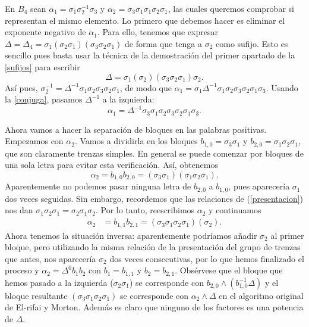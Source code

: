 \documentclass[bibtex, anon]{TEMat-article}
\begin{document}
\begin{ejemplo}\label{ejnormal}
	En $B_4$ sean $\alpha_1=\sigma_1\sigma_2^{-1}\sigma_3$ y $\alpha_2=\sigma_3\sigma_1\sigma_1\sigma_2\sigma_1$, las cuales queremos comprobar si representan el mismo elemento. Lo primero que debemos hacer es eliminar el exponente negativo de $\alpha_1$. Para ello, tenemos que expresar $\Delta=\Delta_4=\sigma_1(\sigma_2\sigma_1)(\sigma_3\sigma_2\sigma_1)$ de forma que tenga a $\sigma_2$ como sufijo. Esto es sencillo pues basta usar la técnica de la demostración del primer apartado de la \cref{sufijos} para escribir
	\[
	\Delta=\sigma_1(\sigma_2)(\sigma_3\sigma_2\sigma_1)\sigma_2.
	\]
	Así pues, $\sigma_2^{-1}=\Delta^{-1}\sigma_1\sigma_2\sigma_3\sigma_2\sigma_1$, de modo que $\alpha_1=\sigma_1\Delta^{-1}\sigma_1\sigma_2\sigma_3\sigma_2\sigma_1\sigma_3$. Usando la \cref{conjuga}, pasamos $\Delta^{-1}$ a la izquierda:
	\[
	\alpha_1=\Delta^{-1}\sigma_3\sigma_1\sigma_2\sigma_3\sigma_2\sigma_1\sigma_3.
	\]
	
	Ahora vamos a hacer la separación de bloques en las palabras positivas. Empezamos con $\alpha_2$. Vamos a dividirla en los bloques $b_{1,0}=\sigma_3\sigma_1$ y $b_{2,0}=\sigma_1\sigma_2\sigma_1$, que son claramente trenzas simples. En general se puede comenzar por bloques de una sola letra para evitar esta verificación. Así, obtenemos
	\[
	\alpha_2=b_{1,0}b_{2,0}=(\sigma_3\sigma_1)(\sigma_1\sigma_2\sigma_1).
	\]
	Aparentemente no podemos pasar ninguna letra de $b_{2,0}$ a $b_{1,0}$, pues aparecería $\sigma_1$ dos veces seguidas. Sin embargo, recordemos que las relaciones de (\ref{presentacion}) nos dan $\sigma_1\sigma_2\sigma_1=\sigma_2\sigma_1\sigma_2$. Por lo tanto, reescribimos $\alpha_2$ y continuamos
	\begin{align*}
	\alpha_2&=b_{1,1}b_{2,1}=(\sigma_3\sigma_1\sigma_2\sigma_1)(\sigma_2).
	\end{align*}
	Ahora tenemos la situación inversa: aparentemente podríamos añadir $\sigma_2$ al primer bloque, pero utilizando la misma relación de la presentación del grupo de trenzas que antes, nos aparecería $\sigma_2$ dos veces consecutivas, por lo que hemos finalizado el proceso y $\alpha_2=\Delta^0b_1b_2$ con $b_1=b_{1,1}$ y $b_2=b_{2,1}$. Obsérvese que el bloque que hemos pasado a la izquierda ($\sigma_2\sigma_1$) se corresponde con $b_{2,0}\land (b_{1,0}^{-1}\Delta)$ y el bloque resultante $(\sigma_3\sigma_1\sigma_2\sigma_1)$ se corresponde con $\alpha_2\land\Delta$ en el algoritmo original de El-rifai y Morton. Además es claro que ninguno de los factores es una potencia de $\Delta$.
	\end{ejemplo}
	
	

\nocite{*}
\printbibliography[heading=bibintoc]
\end{document}
